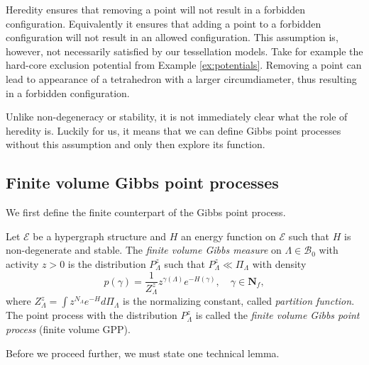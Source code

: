 Heredity ensures that removing a point will not result in a forbidden configuration. Equivalently it ensures that adding a point to a forbidden configuration will not result in an allowed configuration. This assumption is, however, not necessarily satisfied by our tessellation models. Take for example the hard-core exclusion potential from Example \ref{ex:potentials}. Removing a point can lead to appearance of a tetrahedron with a larger circumdiameter, thus resulting in a forbidden configuration.\newline

Unlike non-degeneracy or stability, it is not immediately clear what the role of heredity is. Luckily for us, it means that we can define Gibbs point processes without this assumption and only then explore its function.



\subsection{Finite volume Gibbs point processes}
We first define the finite counterpart of the Gibbs point process.

\begin{definition}\label{def:fGPP}
	Let $\mathcal E$ be a hypergraph structure and $H$ an energy function on $\mathcal E$ such that $H$ is non-degenerate and stable. The \textit{finite volume Gibbs measure} on $\Lambda\in \mathcal B_0$ with activity $z>0$ is the distribution $P^z_\Lambda$ such that $P^z_\Lambda \ll \Pi_\Lambda$ with density
	$$p(\gamma) = \frac 1{Z^{z}_\Lambda} z^{\gamma(\Lambda)} e^{-H(\gamma)},\quad \gamma \in \mathbf N_f,$$
where  $Z^z_\Lambda = \int z^{N_\Lambda} e^{-H} d\Pi_\Lambda$ is the normalizing constant, called \textit{partition function}. \newline
The point process with the distribution $P^z_{\Lambda}$ is called the \textit{finite volume Gibbs point process} (finite volume GPP). 
\end{definition}

Before we proceed further, we must state one technical lemma.


